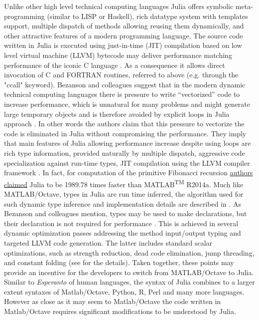 Unlike other high level technical computing languages Julia offers symbolic meta-programming (similar to LISP or Haskell), rich datatype system with templates support, multiple dispatch of methods allowing reusing them dynamically, and other attractive features of a modern programming language. The source code written in Julia is executed using just-in-time (JIT) compilation based on low level virtual machine (LLVM) \cite{Lattner_2004} bytecode may deliver performance matching performance of the iconic C language \cite{bezanson2012julia, bezanson2014julia}. As a consequence it allows direct invocation of C and FORTRAN routines, referred to above (e.g. through the "ccall" keyword). Bezanson and colleagues suggest that in the modern dynamic technical computing languages there is pressure to write “vectorized” code to increase performance, which is unnatural for many problems and might generate large temporary objects and is therefore avoided by explicit loops in Julia approach \cite{bezanson2012julia}. In other words the authors claim that this pressure to vectorize the code is eliminated in Julia without compromising the performance. They imply that main features of Julia allowing performance increase despite using loops are rich type information, provided naturally by multiple dispatch, aggressive code specialization against run-time types, JIT compilation using the LLVM compiler framework \cite{bezanson2012julia, Lattner_2004}. In fact, for computation of the primitive Fibonacci recursion \href{http://julialang.org/benchmarks/}{authors claimed} Julia to be 1989.78 times faster than MATLAB\textsuperscript{TM} R2014a. Much like MATLAB/Octave, types in Julia are run time inferred, the algorithm used for such dynamic type inference and implementation details are described in \cite{Kaplan_1980, bezanson2012julia}. As Bezanson and colleagues mention, types may be used to make declarations, but their declaration is not required for performance \cite{bezanson2012julia}. This is achieved in several dynamic optimization passes addressing the method input/output typing and targeted LLVM code generation. The latter includes standard scalar optimizations, such as strength reduction, dead code elimination, jump threading, and constant folding (see \cite{bezanson2012julia} for the details). Taken together, these points may provide an incentive for the developers to switch from MATLAB/Octave to Julia. Similar to \textit{Esperanto} of human languages, the syntax of Julia combines to a larger extent syntaxes of Matlab/Octave, Python, R, Perl and many more languages. However as close as it may seem to Matlab/Octave the code written in Matlab/Octave requires significant modifications to be understood by Julia.

